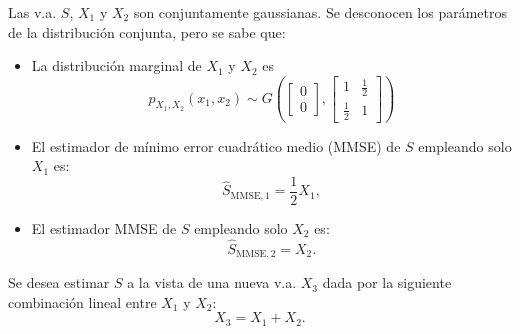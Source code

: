 \ifspanish

\question[20] %

Las v.a. $S$, $X_1$ y $X_2$ son conjuntamente gaussianas. Se desconocen los parámetros de la distribución conjunta, pero se sabe que:
\begin{itemize}
\item La distribución marginal de $X_1$ y $X_2$ es
$$p_{X_1,X_2}\left ( x_1,x_2\right) \sim G\left (  \left[ \begin{array}{c}   0 \\ 0    \end{array} \right] , \left[ \begin{array}{cc}  1 & \frac{1}{2} \\ \frac{1}{2} & 1  \end{array} \right]\right)$$
\item El estimador de mínimo error cuadrático medio (MMSE) de $S$ empleando solo $X_1$ es:
$$\widehat S_{\text{MMSE},1}=\frac{1}{2} X_1,$$
\item El estimador MMSE de $S$ empleando solo $X_2$ es:
$$\widehat S_{\text{MMSE},2}= X_2.$$
\end{itemize}

Se desea estimar $S$ a la vista de una nueva v.a. $X_3$ dada por la siguiente combinación lineal entre $X_1$ y $X_2$:
$$X_3= X_1 + X_2.$$


\begin{solution}
\end{solution}

